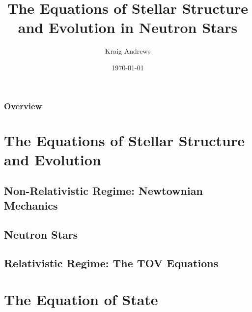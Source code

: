 \documentclass{beamer}
\title[NS Structure and Evolution]{The Equations of Stellar Structure and Evolution in Neutron Stars} %
\author{Kraig Andrews} %
\institute[Michigan State Univeristy] %
{
Michigan State University \\ %
\medskip
\textit{andre220@msu.edu} %
}
\date{\today} %
\begin{document}
\begin{frame}
\titlepage %
\end{frame}

\begin{frame}
\frametitle{Overview} %
\tableofcontents %
\end{frame}



\section{The Equations of Stellar Structure and Evolution} %

\subsection{Non-Relativistic Regime: Newtownian Mechanics} %

\subsection{Neutron Stars}
\subsection{Relativistic Regime: The TOV Equations}

\section{The Equation of State}
\end{document}
